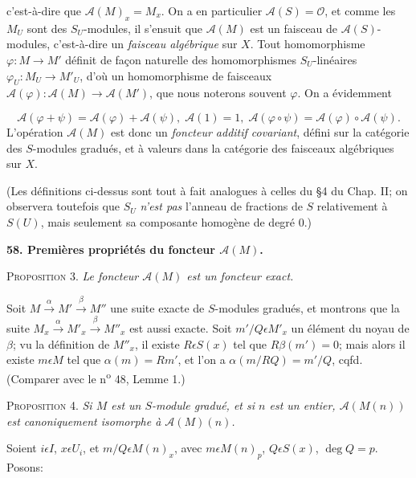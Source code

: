 
 c'est-à-dire que $\mathcal{A}(M)_x = M_x$. On a en particulier $\mathcal{A}(S) = \mathcal{O}$, et comme les $M_U$ sont des $S_U$-modules, il s'ensuit que $\mathcal{A}(M)$ est un faisceau de $\mathcal{A}(S)$-modules, c'est-à-dire un \textit{faisceau algébrique} sur $X$. Tout homomorphisme $\varphi : M \to M'$ définit de façon naturelle des homomorphismes $S_U$-linéaires $\varphi_U : M_U \to M'_U$, d'où un homomorphisme de faisceaux $\mathcal{A}(\varphi) : \mathcal{A}(M) \to \mathcal{A}(M')$, que nous noterons souvent $\varphi$. On a évidemment

\begin{equation*}
\mathcal{A}(\varphi + \psi) = \mathcal{A}(\varphi) + \mathcal{A}(\psi), \; \mathcal{A}(1) = 1, \; \mathcal{A}(\varphi \circ \psi) = \mathcal{A}(\varphi) \circ \mathcal{A}(\psi).
\end{equation*}
L'opération $\mathcal{A}(M)$ est donc un \textit{foncteur additif covariant}, défini sur la catégorie des $S$-modules gradués, et à valeurs dans la catégorie des faisceaux algébriques sur $X$.

(Les définitions ci-dessus sont tout à fait analogues à celles du §4 du Chap. II; on observera toutefois que $S_U$ \textit{n'est pas} l'anneau de fractions de $S$ relativement à $S(U)$, mais seulement sa composante homogène de degré 0.)


\textbf{58. Premières propriétés du foncteur $\mathcal{A}(M)$.}

\textsc{Proposition} 3. \textit{Le foncteur $\mathcal{A}(M)$ est un foncteur exact.}

Soit $M \xrightarrow{\alpha} M' \xrightarrow{\beta} M''$ une suite exacte de $S$-modules gradués, et montrons que la suite $M_x \xrightarrow{\alpha} M'_x \xrightarrow{\beta} M''_x$ est aussi exacte. Soit $m'/Q \epsilon M'_x$ un élément du noyau de $\beta$; vu la définition de $M''_x$, il existe $R \epsilon S(x)$ tel que $R\beta(m') = 0$; mais alors il existe $m \epsilon M$ tel que $\alpha(m) = Rm'$, et l'on a $\alpha(m/RQ) = m'/Q$, cqfd. (Comparer avec le n\textsuperscript{o} 48, Lemme 1.)

\textsc{Proposition} 4. \textit{Si $M$ est un $S$-module gradué, et si $n$ est un entier, $\mathcal{A}(M(n))$ est canoniquement isomorphe à $\mathcal{A}(M)(n)$.}

Soient $i \epsilon I$, $x \epsilon U_i$, et $m/Q \epsilon M(n)_x$, avec $m \epsilon M(n)_p$, $Q \epsilon S(x)$, $\deg Q = p$. Posons:

